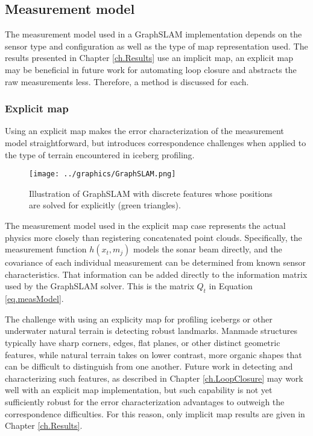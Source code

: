 \subsection{Measurement model}

The measurement model used in a GraphSLAM implementation depends on the sensor type and configuration as well as the type of map representation used. The results presented in Chapter \ref{ch.Results} use an implicit map, an explicit map may be beneficial in future work for automating loop closure and abstracts the raw measurements less. Therefore, a method is discussed for each.

\subsubsection{Explicit map}

Using an explicit map makes the error characterization of the measurement model straightforward, but introduces correspondence challenges when applied to the type of terrain encountered in iceberg profiling. 

\begin{figure}[htb]
   \centering
   \texttt{[image: ../graphics/GraphSLAM.png]} %
   \caption{Illustration of GraphSLAM with discrete features whose positions are solved for explicitly (green triangles).  }
   \label{fig:ExplicitMap}
\end{figure}

The measurement model used in the explicit map case represents the actual physics more closely than registering concatenated point clouds. Specifically, the measurement function $h\left(x_t,m_j\right)$ models the sonar beam directly, and the covariance of each individual measurement can be determined from known sensor characteristics. That information can be added directly to the information matrix used by the GraphSLAM solver. This is the matrix $Q_t$ in Equation \ref{eq.measModel}. 

The challenge with using an explicity map for profiling icebergs or other underwater natural terrain is detecting robust landmarks. Manmade structures typically have sharp corners, edges, flat planes, or other distinct geometric features, while natural terrain takes on lower contrast, more organic shapes that can be difficult to distinguish from one another. Future work in detecting and characterizing such features, as described in Chapter \ref{ch.LoopClosure} may work well with an explicit map implementation, but such capability is not yet sufficiently robust for the error characterization advantages to outweigh the correspondence difficulties. For this reason, only implicit map results are given in Chapter \ref{ch.Results}.



